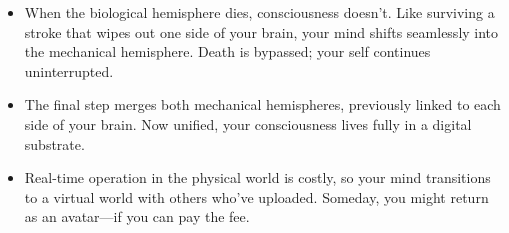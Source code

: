 \documentclass[10pt]{article}
\begin{document}
\begin{sloppypar}
\begin{itemize}
    \item When the biological hemisphere dies, consciousness doesn’t. Like surviving a stroke that wipes out one side of your brain, your mind shifts seamlessly into the mechanical hemisphere. Death is bypassed; your self continues uninterrupted.
    \item The final step merges both mechanical hemispheres, previously linked to each side of your brain. Now unified, your consciousness lives fully in a digital substrate.
    \item Real-time operation in the physical world is costly, so your mind transitions to a virtual world with others who’ve uploaded. Someday, you might return as an avatar—if you can pay the fee.
  \end{itemize}


\end{sloppypar}
\end{document}
